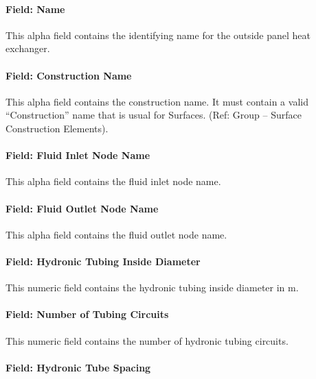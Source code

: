 \paragraph{Field: Name}\label{field-name-12-001}

This alpha field contains the identifying name for the outside panel heat exchanger.

\paragraph{Field: Construction Name}\label{field-construction-name-000}

This alpha field contains the construction name. It must contain a valid ``Construction'' name that is usual for Surfaces. (Ref: Group -- Surface Construction Elements).

\paragraph{Field: Fluid Inlet Node Name}\label{field-fluid-inlet-node-name-1}

This alpha field contains the fluid inlet node name.

\paragraph{Field: Fluid Outlet Node Name}\label{field-fluid-outlet-node-name-1}

This alpha field contains the fluid outlet node name.

\paragraph{Field: Hydronic Tubing Inside Diameter}\label{field-hydronic-tubing-inside-diameter-1}

This numeric field contains the hydronic tubing inside diameter in m.

\paragraph{Field: Number of Tubing Circuits}\label{field-number-of-tubing-circuits-1}

This numeric field contains the number of hydronic tubing circuits.

\paragraph{Field: Hydronic Tube Spacing}\label{field-hydronic-tube-spacing}

